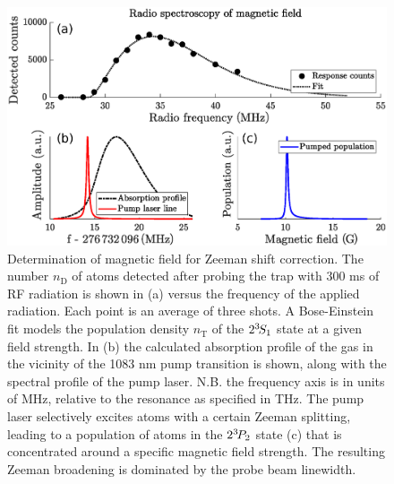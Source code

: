 	\begin{figure}
	\centering
  \includegraphics[width=\textwidth]{fig/spectroscopy/rf_spec_subfig}
  \caption{Determination of magnetic field for Zeeman shift correction.
	The number $n_\text{D}$ of atoms detected after probing the trap with 300 ms of RF radiation is shown in (a) versus the frequency of the applied radiation.
	Each point is an average of three shots.
	A Bose-Einstein fit models the population density $n_\text{T}$ of the $2^{3\!} S_1$ state at a given field strength.
	In (b) the calculated absorption profile of the gas in the vicinity of the 1083 nm pump transition is shown, along with the spectral profile of the pump laser. N.B. the frequency axis is in units of MHz, relative to the resonance as specified in THz.
	The pump laser selectively excites atoms with a certain Zeeman splitting, leading to a population of atoms in the $2^{3\!} P_2$ state (c) that is concentrated around a specific magnetic field strength.
	The resulting Zeeman broadening is dominated by the probe beam linewidth.}
  \label{fig:RF_spec}
\end{figure}



